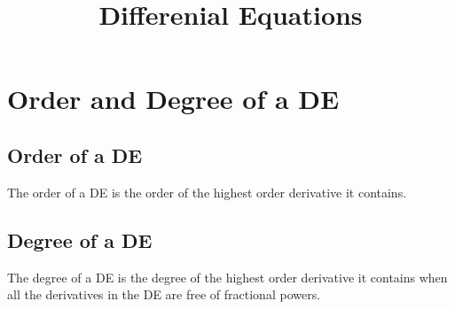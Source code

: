 \documentclass{article}
\title{Differenial Equations}
\author{}
\date{}
\begin{document}
\maketitle

\section{Order and Degree of a DE}
\subsection{Order of a DE}
The order of a DE is the order of the highest order derivative it contains.
\subsection{Degree of a DE}
The degree of a DE is the degree of the highest order derivative it contains when all the derivatives in the DE are free of fractional powers.
\end{document}
